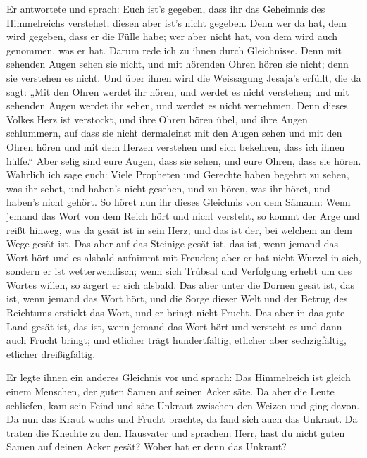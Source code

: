  Er antwortete und sprach: Euch ist's gegeben, dass ihr
das Geheimnis des Himmelreichs verstehet; diesen aber ist's nicht
gegeben.  Denn wer da hat, dem wird gegeben, dass er die
Fülle habe; wer aber nicht hat, von dem wird auch genommen, was er hat.
 Darum rede ich zu ihnen durch Gleichnisse. Denn mit
sehenden Augen sehen sie nicht, und mit hörenden Ohren hören sie nicht;
denn sie verstehen es nicht.  Und über ihnen wird die
Weissagung Jesaja's erfüllt, die da sagt: „Mit den Ohren werdet ihr
hören, und werdet es nicht verstehen; und mit sehenden Augen werdet ihr
sehen, und werdet es nicht vernehmen.  Denn dieses Volkes
Herz ist verstockt, und ihre Ohren hören übel, und ihre Augen
schlummern, auf dass sie nicht dermaleinst mit den Augen sehen und mit
den Ohren hören und mit dem Herzen verstehen und sich bekehren, dass ich
ihnen hülfe.``  Aber selig sind eure Augen, dass sie
sehen, und eure Ohren, dass sie hören.  Wahrlich ich sage
euch: Viele Propheten und Gerechte haben begehrt zu sehen, was ihr
sehet, und haben's nicht gesehen, und zu hören, was ihr höret, und
haben's nicht gehört.  So höret nun ihr dieses Gleichnis
von dem Sämann:  Wenn jemand das Wort von dem Reich hört
und nicht versteht, so kommt der Arge und reißt hinweg, was da gesät ist
in sein Herz; und das ist der, bei welchem an dem Wege gesät ist.
 Das aber auf das Steinige gesät ist, das ist, wenn
jemand das Wort hört und es alsbald aufnimmt mit Freuden;
 aber er hat nicht Wurzel in sich, sondern er ist
wetterwendisch; wenn sich Trübsal und Verfolgung erhebt um des Wortes
willen, so ärgert er sich alsbald.  Das aber unter die
Dornen gesät ist, das ist, wenn jemand das Wort hört, und die Sorge
dieser Welt und der Betrug des Reichtums erstickt das Wort, und er
bringt nicht Frucht.  Das aber in das gute Land gesät
ist, das ist, wenn jemand das Wort hört und versteht es und dann auch
Frucht bringt; und etlicher trägt hundertfältig, etlicher aber
sechzigfältig, etlicher dreißigfältig.

 Er legte ihnen ein anderes Gleichnis vor und sprach: Das
Himmelreich ist gleich einem Menschen, der guten Samen auf seinen Acker
säte.  Da aber die Leute schliefen, kam sein Feind und
säte Unkraut zwischen den Weizen und ging davon.  Da nun
das Kraut wuchs und Frucht brachte, da fand sich auch das Unkraut.
 Da traten die Knechte zu dem Hausvater und sprachen:
Herr, hast du nicht guten Samen auf deinen Acker gesät? Woher hat er
denn das Unkraut?

